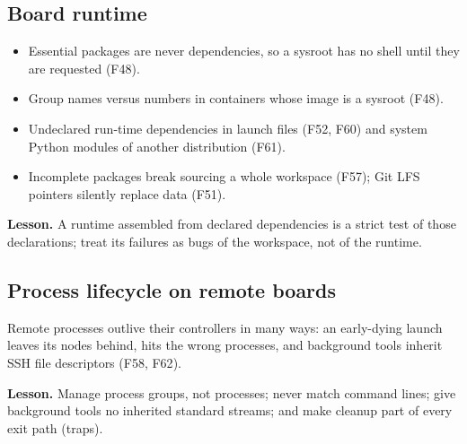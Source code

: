 \documentclass[11pt,a4paper]{article}
\newcommand{\finding}[1]{\textsf{\small F#1}}
\begin{document}
\subsection{Board runtime}
\begin{itemize}
  \item Essential packages are never dependencies, so a sysroot has no shell until they are requested (\finding{48}).
  \item Group names versus numbers in containers whose image is a sysroot (\finding{48}).
  \item Undeclared run-time dependencies in launch files (\finding{52}, \finding{60}) and system Python modules of another
        distribution (\finding{61}).
  \item Incomplete packages break sourcing a whole workspace (\finding{57}); Git LFS pointers silently replace data
        (\finding{51}).
\end{itemize}
\begin{lesson}\textbf{Lesson.} A runtime assembled from declared dependencies is a strict test of those declarations;
treat its failures as bugs of the workspace, not of the runtime.\end{lesson}

\subsection{Process lifecycle on remote boards}
Remote processes outlive their controllers in many ways: an early-dying launch leaves its nodes behind, 
hits the wrong processes, and background tools inherit SSH file descriptors (\finding{58}, \finding{62}).
\begin{lesson}\textbf{Lesson.} Manage process groups, not processes; never match command lines; give background tools no
inherited standard streams; and make cleanup part of every exit path (traps).\end{lesson}
\end{document}
